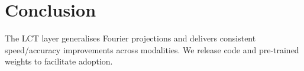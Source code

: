 \section{Conclusion}
The \textsc{LCT} layer generalises Fourier projections and delivers consistent speed/accuracy improvements across modalities.  We release code and pre‐trained weights to facilitate adoption.